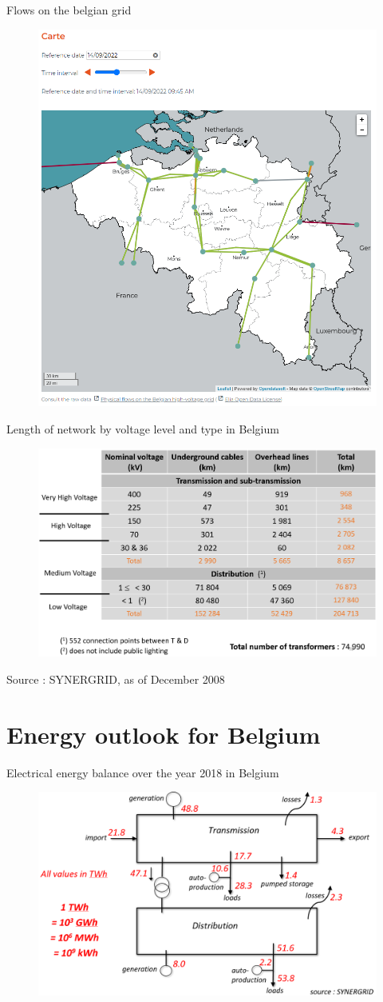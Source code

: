 \begin{frame}{Flows on the belgian grid}
\begin{figure}
\centering
\includegraphics[width=0.4\linewidth]{images/20220914_ELIA_flows.png}
\end{figure}
\end{frame}

\begin{frame}{Length of network by voltage level and type in Belgium}
\begin{figure}
\centering
\includegraphics[width=0.6\linewidth]{images/stats_cables_and_lines_be.png}
\end{figure}
\vfill
\footnotesize{Source : SYNERGRID, as of December 2008}
\end{frame}


\section{Energy outlook for Belgium}

\begin{frame}
{Electrical energy balance over the year 2018 in Belgium}
\begin{figure}
\centering
\includegraphics[width=\linewidth]{images/energy_balance_BE_2018.png}
\end{figure}
\end{frame}

